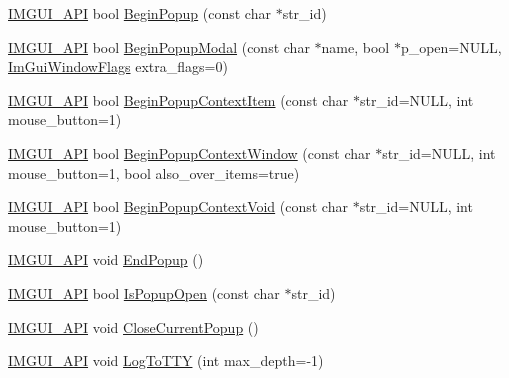\begin{DoxyCompactItemize}
\item 
\mbox{\hyperlink{imgui_8h_a43829975e84e45d1149597467a14bbf5}{I\+M\+G\+U\+I\+\_\+\+A\+PI}} bool \mbox{\hyperlink{namespace_im_gui_ab71527de4b52ff970e5396040302e134}{Begin\+Popup}} (const char $\ast$str\+\_\+id)
\item 
\mbox{\hyperlink{imgui_8h_a43829975e84e45d1149597467a14bbf5}{I\+M\+G\+U\+I\+\_\+\+A\+PI}} bool \mbox{\hyperlink{namespace_im_gui_aa70aaf1dacf5702f85feca6f729a307a}{Begin\+Popup\+Modal}} (const char $\ast$name, bool $\ast$p\+\_\+open=N\+U\+LL, \mbox{\hyperlink{imgui_8h_a0b8e067ab4f7a818828c8d89e531addc}{Im\+Gui\+Window\+Flags}} extra\+\_\+flags=0)
\item 
\mbox{\hyperlink{imgui_8h_a43829975e84e45d1149597467a14bbf5}{I\+M\+G\+U\+I\+\_\+\+A\+PI}} bool \mbox{\hyperlink{namespace_im_gui_a579fc507f5b5d164c8fd628aee3d7bbd}{Begin\+Popup\+Context\+Item}} (const char $\ast$str\+\_\+id=N\+U\+LL, int mouse\+\_\+button=1)
\item 
\mbox{\hyperlink{imgui_8h_a43829975e84e45d1149597467a14bbf5}{I\+M\+G\+U\+I\+\_\+\+A\+PI}} bool \mbox{\hyperlink{namespace_im_gui_acf98c99f041ea341d0328e071c56411b}{Begin\+Popup\+Context\+Window}} (const char $\ast$str\+\_\+id=N\+U\+LL, int mouse\+\_\+button=1, bool also\+\_\+over\+\_\+items=true)
\item 
\mbox{\hyperlink{imgui_8h_a43829975e84e45d1149597467a14bbf5}{I\+M\+G\+U\+I\+\_\+\+A\+PI}} bool \mbox{\hyperlink{namespace_im_gui_a87a2228929503fff067d2e167a690751}{Begin\+Popup\+Context\+Void}} (const char $\ast$str\+\_\+id=N\+U\+LL, int mouse\+\_\+button=1)
\item 
\mbox{\hyperlink{imgui_8h_a43829975e84e45d1149597467a14bbf5}{I\+M\+G\+U\+I\+\_\+\+A\+PI}} void \mbox{\hyperlink{namespace_im_gui_aa6a9b5696f2ea7eed7683425fc77b8f2}{End\+Popup}} ()
\item 
\mbox{\hyperlink{imgui_8h_a43829975e84e45d1149597467a14bbf5}{I\+M\+G\+U\+I\+\_\+\+A\+PI}} bool \mbox{\hyperlink{namespace_im_gui_a8f25c1565fca7cb9796c54e5cebc44ee}{Is\+Popup\+Open}} (const char $\ast$str\+\_\+id)
\item 
\mbox{\hyperlink{imgui_8h_a43829975e84e45d1149597467a14bbf5}{I\+M\+G\+U\+I\+\_\+\+A\+PI}} void \mbox{\hyperlink{namespace_im_gui_aeaec6479834db7918260fc082107f90b}{Close\+Current\+Popup}} ()
\item 
\mbox{\hyperlink{imgui_8h_a43829975e84e45d1149597467a14bbf5}{I\+M\+G\+U\+I\+\_\+\+A\+PI}} void \mbox{\hyperlink{namespace_im_gui_a37696f5296f33ae4218f53b40b81cccc}{Log\+To\+T\+TY}} (int max\+\_\+depth=-\/1)
\item 

\end{DoxyCompactItemize}
